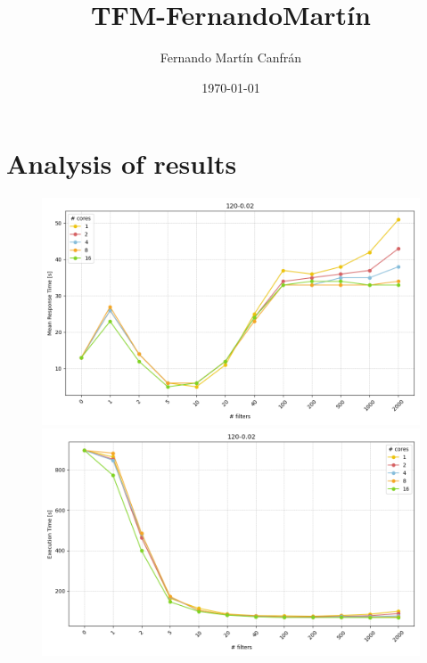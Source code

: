 \documentclass[12pt,a4paper]{article}
\title{TFM-FernandoMartín}
\author{Fernando Martín Canfrán}
\date{\today}
\begin{document}
\maketitle


\newpage
\newpage
\section{Analysis of results}


\begin{figure}[H]
    \centering
    \hspace*{-3cm} %
    \begin{minipage}{0.5\textwidth}
        \centering
        \includegraphics[scale=0.4]{images/4-Experiments/NRT/small/120-0.02/combined/plots/mrt-1.png}
        \caption*{}
    \end{minipage}
    \hspace{0.16\textwidth}
    \begin{minipage}{0.5\textwidth}
        \centering
        \includegraphics[scale=0.4]{images/4-Experiments/NRT/small/120-0.02/combined/plots/execTime-1.png}
        \caption*{}
    \end{minipage}
    

\end{figure}
\end{document}
